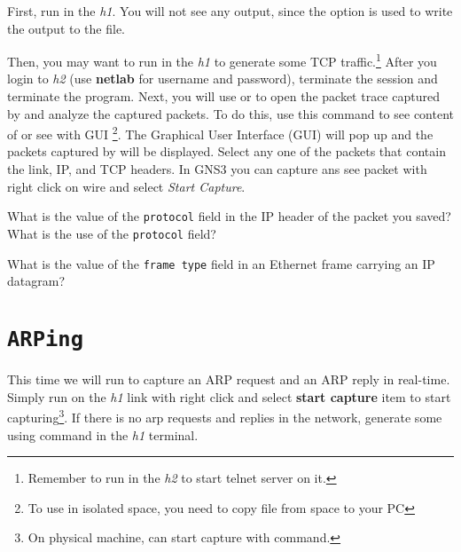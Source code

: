 \documentclass{../UTNetLab}
\begin{document}
    First, run  in the \textit{h1}.
    You will not see any  output, since the  option is used to write the output to the  file.

    Then, you may want to run  in the \textit{h1} to generate some TCP traffic.\footnote{Remember to run  in the \textit{h2} to start telnet server on it.}
    After you login to \textit{h2} (use \textbf{netlab} for username and password), terminate the  session and terminate the  program.
    Next, you will use  or  to open the packet trace captured by  and analyze the captured packets.
    To do this, use this command  to see content of  or see with GUI \footnote{To use  in isolated  space, you need to copy file from   space to your PC}.
    The  Graphical User Interface (GUI) will pop up and the packets captured by  will be displayed.
    Select any one of the packets that contain the link, IP, and TCP headers.
    In GNS3 you can capture ans see packet with right click on wire and select \textit{Start Capture}.
    
    \begin{report}
        \item What is the value of the \texttt{protocol} field in the IP header of the packet you saved?
            What is the use of the \texttt{protocol} field?

        \item What is the value of the \texttt{frame type} field in an Ethernet frame carrying an IP datagram?
    \end{report}

\section{\texttt{ARPing}}
    This time we will run  to capture an ARP request and an ARP reply in real-time.
    Simply run  on the \textit{h1} link with right click and select \textbf{start capture} item to start capturing\footnote{On physical machine, can start capture with  command.}.
    If there is no arp requests and replies in the network, generate some using  command in the \textit{h1} terminal.
\end{document}
